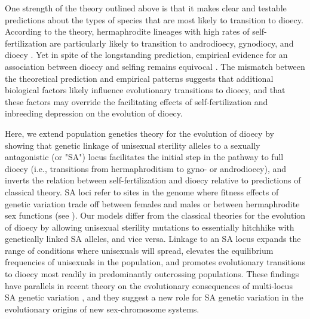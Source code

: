 \documentclass{article}
\newcommand\hl[1]{%
  \bgroup
  \hskip0pt\color{blue!80!black}%
  #1%
  \egroup
}
\begin{document}
\hl{One strength of the theory outlined above is that it makes clear and testable predictions about the types of species that are most likely to transition to dioecy. According to the theory, hermaphrodite lineages with high rates of self-fertilization are particularly likely to transition to androdioecy, gynodiocy, and dioecy \citep{Charlesworth1978a, Charlesworth1999, KaferPannell2017}. Yet in spite of the longstanding prediction, empirical evidence for an association between dioecy and selfing remains equivocal \citep{Charlesworth1985, Charlesworth2006, Renner2014}. The mismatch between the theoretical prediction and empirical patterns suggests that additional biological factors likely influence evolutionary transitions to dioecy, and that these factors may override the facilitating effects of self-fertilization and inbreeding depression on the evolution of dioecy.} 

\hl{Here, we extend population genetics theory for the evolution of dioecy by showing that genetic linkage of unisexual sterility alleles to a sexually antagonistic (or "SA") locus facilitates the initial step in the pathway to full dioecy (i.e., transitions from hermaphroditism to gyno- or androdioecy), and inverts the relation between self-fertilization and dioecy relative to predictions of classical theory. SA loci refer to sites in the genome where fitness effects of genetic variation trade off between females and males or between hermaphrodite sex functions (see \citealt{Gregorious1982, Morgan1992a, Morgan1992b, JordanConnallon2014, Olito2017}). Our models differ from the classical theories for the evolution of dioecy \citep{Charlesworth1978a} by allowing unisexual sterility mutations to essentially hitchhike with genetically linked SA alleles, and vice versa. Linkage to an SA locus expands the range of conditions where unisexuals will spread, elevates the equilibrium frequencies of unisexuals in the population, and promotes evolutionary transitions to dioecy most readily in predominantly outcrossing populations. These findings have parallels in recent theory on the evolutionary consequences of multi-locus SA genetic variation \citep{ConnallonClark2010, Patten2010, UbedaPatten2010, ConnallonJordan2016, Olito2017}, and they suggest a new role for SA genetic variation in the evolutionary origins of new sex-chromosome systems.}
\end{document}
